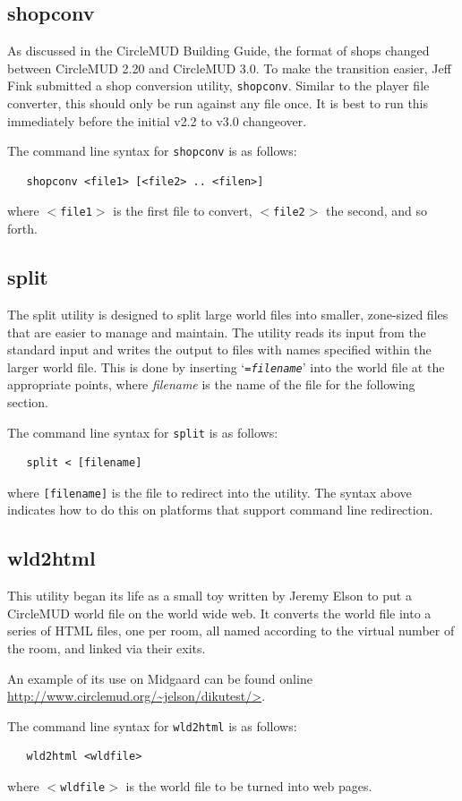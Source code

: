\documentclass[11pt]{article}
\begin{document}
\subsection{shopconv}
As discussed in the CircleMUD Building Guide, the format of shops changed between CircleMUD 2.20 and CircleMUD 3.0.  To make the transition easier, Jeff Fink submitted a shop conversion utility, \texttt{shopconv}.  Similar to the player file converter, this should only be run against any file once.  It is best to run this immediately before the initial v2.2 to v3.0 changeover.
\par
The command line syntax for \texttt{shopconv} is as follows:
\begin{verbatim}
   shopconv <file1> [<file2> .. <filen>]
\end{verbatim}
where \texttt{$<$file1$>$} is the first file to convert, \texttt{$<$file2$>$} the second, and so forth.

\subsection{split}
The split utility is designed to split large world files into smaller, zone-sized files that are easier to manage and maintain.  The utility reads its input from the standard input and writes the output to files with names specified within the larger world file.  This is done by inserting `\texttt{={\it filename}}' into the world file at the appropriate points, where {\it filename} is the name of the file for the following section.
\par
The command line syntax for \texttt{split} is as follows:
\begin{verbatim}
   split < [filename]
\end{verbatim}
where \texttt{[filename]} is the file to redirect into the utility.  The syntax above indicates how to do this on platforms that support command line redirection.

\subsection{wld2html}
This utility began its life as a small toy written by Jeremy Elson to put a CircleMUD world file on the world wide web.  It converts the world file into a series of HTML files, one per room, all named according to the virtual number of the room, and linked via their exits.
\par 
An example of its use on Midgaard can be found online
\url{http://www.circlemud.org/~jelson/dikutest/>}.
\par
The command line syntax for \texttt{wld2html} is as follows:
\begin{verbatim}
   wld2html <wldfile>
\end{verbatim}
where \texttt{$<$wldfile$>$} is the world file to be turned into web pages.
\end{document}
